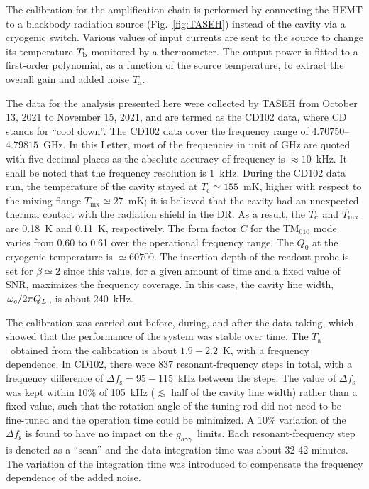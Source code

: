 \documentclass[%
 reprint,prl, %
superscriptaddress,
nobibnotes,
 amsmath,amssymb,
 aps,
]{revtex4-2}
\newcommand{\bgagg}{\ensuremath{g_{a\gamma\gamma}}}
\newcommand{\ta}{\ensuremath{T_\text{a}}}
\newcommand{\flo}{\ensuremath{4.70750}}
\newcommand{\fhi}{\ensuremath{4.79815}}
\newcommand{\noise}{\ensuremath{1.9 - 2.2}}
\begin{document}
The calibration for the amplification chain is performed by 
connecting the HEMT to a blackbody radiation source (Fig.~\ref{fig:TASEH}) 
instead of the cavity via a cryogenic switch.  
Various values of input currents are sent to the 
source to change its temperature $T_{\text b}$ monitored by a thermometer. 
The output power is fitted to a first-order polynomial, as a function of
the source temperature, to extract the overall gain and added noise \ta. 


The data for the analysis presented here were collected by TASEH 
from October 13, 2021 to November 15, 2021, and are termed as the CD102 data, 
where CD stands for ``cool down''. 
The CD102 data cover the frequency range of \flo--\fhi~GHz. In this Letter, 
most of the frequencies in unit of GHz are quoted with five decimal places as 
the absolute accuracy of frequency is $\approx 10$~kHz. It shall be noted 
that the frequency resolution is 1~kHz.  
During the CD102 data run, 
the temperature of the cavity stayed at $T_\text{c}\simeq155$~mK, higher 
with respect to the mixing flange $T_\text{mx}\simeq27$~mK; it is believed 
that the cavity had an 
unexpected thermal contact with the radiation shield in the DR. 
As a result, the $\Tilde{T}_\text{c}$ and $\Tilde{T}_\text{mx}$ 
are 0.18~K and 0.11~K, respectively. 
The form factor $C$ for 
the TM$_{010}$ mode varies from 0.60 to 0.61 over the operational 
frequency range. 
The $Q_0$ at the cryogenic temperature is $\simeq 60700$. 
The insertion depth of the readout probe is set for 
$\beta\simeq2$ since this value, for a given amount 
of time and a fixed value of SNR, maximizes the frequency coverage. 
In this case, 
the cavity line width, $\left.\omega_c\middle/2\pi Q_L\right.$, is about 
240~kHz. 

The calibration was carried out before, during, and after the data taking,
which showed that the performance of the system was stable over time. 
The \ta\ obtained from the calibration is 
about \noise~K, with a frequency dependence. In CD102, 
there were 837 resonant-frequency steps in total, with a frequency difference 
of $\Delta f_\text{s}=95-115$~kHz between the steps. The value of 
$\Delta f_\text{s}$ was kept within 10\% of 105~kHz ($\lesssim$ half of the 
cavity line width) rather than 
a fixed value, such that the rotation angle of the tuning rod did not need to 
be fine-tuned and the operation time could be minimized. A 10\% variation of 
the $\Delta f_\text{s}$ is found to have no impact on the \bgagg\ limits. 
Each resonant-frequency step is denoted as a ``scan'' 
and the data integration time was about 32-42 minutes. 
The variation of the integration time was introduced to compensate 
the frequency dependence of the added noise. 
\end{document}
